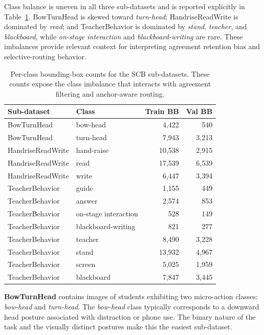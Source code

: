 \documentclass{ieeeaccess}
\begin{document}
Class balance is uneven in all three sub-datasets and is reported
explicitly in Table~\ref{tab:class_balance}.
BowTurnHead is skewed toward \textit{turn-head}; HandriseReadWrite is
dominated by \textit{read}; and TeacherBehavior is dominated by
\textit{stand}, \textit{teacher}, and \textit{blackboard}, while
\textit{on-stage interaction} and \textit{blackboard-writing} are rare.
These imbalances provide relevant context for interpreting agreement
retention bias and selective-routing behavior.

\begin{table}[!t]
\caption{Per-class bounding-box counts for the SCB sub-datasets.
These counts expose the class imbalance that interacts with agreement
filtering and anchor-aware routing.}
\label{tab:class_balance}
\centering
\begin{tabular}{llrr}
\toprule
\textbf{Sub-dataset} & \textbf{Class} & \textbf{Train BB} & \textbf{Val BB} \\
\midrule
BowTurnHead & bow-head & 4{,}422 & 540 \\
BowTurnHead & turn-head & 7{,}943 & 3{,}213 \\
HandriseReadWrite & hand-raise & 10{,}538 & 2{,}915 \\
HandriseReadWrite & read & 17{,}539 & 6{,}539 \\
HandriseReadWrite & write & 6{,}447 & 3{,}394 \\
TeacherBehavior & guide & 1{,}155 & 449 \\
TeacherBehavior & answer & 2{,}574 & 853 \\
TeacherBehavior & on-stage interaction & 528 & 149 \\
TeacherBehavior & blackboard-writing & 821 & 277 \\
TeacherBehavior & teacher & 8{,}490 & 3{,}228 \\
TeacherBehavior & stand & 13{,}932 & 4{,}967 \\
TeacherBehavior & screen & 5{,}025 & 1{,}959 \\
TeacherBehavior & blackboard & 7{,}847 & 3{,}445 \\
\bottomrule
\end{tabular}
\end{table}

\textbf{BowTurnHead} contains images of students exhibiting two
micro-action classes: \textit{bow-head} and \textit{turn-head}.
The \textit{bow-head} class typically corresponds to a downward head
posture associated with distraction or phone use.
The binary nature of the task and the visually distinct postures make
this the easiest sub-dataset.
\end{document}
